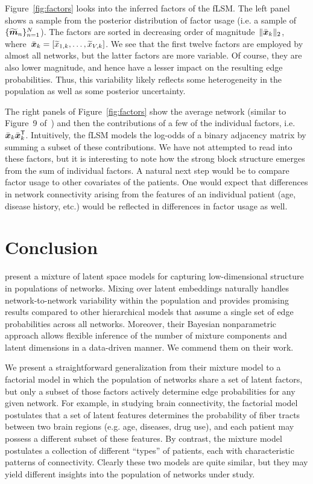 Figure~\ref{fig:factors} looks into the inferred factors of the fLSM.
The left panel shows a sample from the posterior distribution of factor
usage (i.e. a sample of~$\{\widetilde{\boldsymbol{m}}_n\}_{n=1}^N$). The factors
are sorted in decreasing order of magnitude~$\|\bar{\boldsymbol{x}}_k\|_2$,
where~${\bar{\boldsymbol{x}}_k = \left[ \widetilde{x}_{1,k}, \ldots, \widetilde{x}_{V,k} \right]}$.
We see that the first twelve factors are employed by almost all networks,
but the latter factors are more variable.  Of course, they are also
lower magnitude, and hence have a lesser impact on the resulting edge
probabilities.  Thus, this variability likely reflects some heterogeneity
in the population as well as some posterior uncertainty.

The right panels of Figure~\ref{fig:factors} show the average network
(similar to Figure~9 of~\citet{durante2016nonparametric}) and then the
contributions of a few of the individual factors, i.e.~${\bar{\boldsymbol{x}}_k \bar{\boldsymbol{x}}_k^{\mathsf{T}}}$.
Intuitively, the fLSM models the log-odds of a binary adjacency matrix
by summing a subset of these contributions.  We have not attempted to
read into these factors, but it is interesting to note how the strong
block structure emerges from the sum of individual factors.  A natural
next step would be to compare factor usage to other covariates of the
patients.  One would expect that differences in network connectivity
arising from the features of an individual patient (age, disease history,
etc.) would be reflected in differences in factor usage as well.

\section{Conclusion}
\citet{durante2016nonparametric} present a mixture of latent space
models for capturing low-dimensional structure in populations of
networks.  Mixing over latent embeddings naturally handles network-to-network
variability within the population and provides promising results
compared to other hierarchical models that assume a single set of
edge probabilities across all networks.  Moreover, their Bayesian
nonparametric approach allows flexible inference of the number of
mixture components and latent dimensions in a data-driven manner.
We commend them on their work.

We present a straightforward generalization from their mixture
model to a factorial model in which the population of
networks share a set of latent factors, but only a subset of those
factors actively determine edge probabilities for any given network.
For example, in studying brain connectivity, the factorial model postulates
that a set of latent features determines the probability of fiber
tracts between two brain regions (e.g. age, diseases, drug use), and
each patient may possess a different subset of these features. By contrast,
the mixture model postulates a collection of different ``types'' of
patients, each with characteristic patterns of connectivity.  Clearly
these two models are quite similar, but they may yield different
insights into the population of networks under study.

